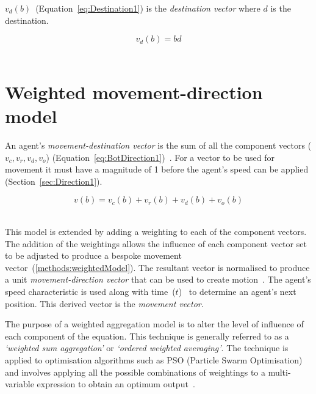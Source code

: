 $v_d(b)$~(Equation~\ref{eq:Destination1}) is the \textit{destination vector} where $d$ is the destination. 

\begin{center}
\begin{equation}\label{eq:Destination1}‎
v_{d}(b) =‎ bd
\end{equation}‎
\end{center}

\section{Weighted movement-direction model}\label{methods:weightedModel}
An agent's \textit{movement-destination vector} is the sum of all the component vectors ($v_c, v_r, v_d, v_o$) (Equation~\ref{eq:BotDirection1})~\cite{HAY:08}. For a vector to be used for movement it must have a magnitude of 1 before the agent's speed can be applied (Section~\ref{sec:Direction1}).

 
\begin{center}
\begin{equation}
\label{eq:BotDirection1}
v(b) =‎ v_{c}(b) + v_{r}(b) + v_{d}(b) + v_{o}(b)
\end{equation}‎
\end{center}


This model is extended by adding a weighting to each of the component vectors. The addition of the weightings allows the influence of each component vector set to be adjusted to produce a bespoke movement vector~(\autoref{methods:weightedModel}). The resultant vector is normalised to produce a unit \textit{movement-direction vector} that can be used to create motion~\cite{KC:08}. The agent's speed characteristic is used along with time~($t$)~\cite{FAP:05, GP:05} to determine an agent's next position. This derived vector is the \textit{movement vector}.

The purpose of a weighted aggregation model is to alter the level of influence of each component of the equation. This technique is generally referred to as a \textit{`weighted sum aggregation'} or \textit{`ordered weighted averaging'}. The technique is applied to optimisation algorithms such as PSO (Particle Swarm Optimisation) and involves applying all the possible combinations of weightings to a multi-variable expression to obtain an optimum output~\cite{MV:12, XTH:09}.

